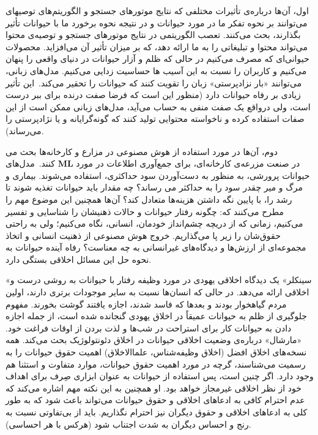 اول، آن‌ها درباره‌ی تأثیرات مختلفی که نتایج موتورهای جستجو و الگوریتم‌های توصیهای می‌توانند بر نحوه تفکر ما در مورد حیوانات و در نتیجه نحوه برخورد ما با حیوانات تأثیر بگذارند، بحث می‌کنند.
تعصب الگوریتمی در نتایج موتورهای جستجو و توصیه‌ی محتوا می‌تواند محتوا و تبلیغاتی را به ما ارائه دهد، که بر میزان تأثیر آن می‌افزاید.
محصولات حیوانی‌ای که مصرف می‌کنیم در حالی که ظلم و آزار حیوانات در دنیای واقعی را پنهان می‌کنیم و کاربران را نسبت به این آسیب ها حساسیت زدایی می‌کنیم.
مدل‌های زبانی، می‌توانند «بار نزادپرستی» زبان را تقویت کنند که حیوانات را تحقیر می‌کند.\     این تأثیر زیادی بر رفاه حیوانات دارد (منظور این است که فرضا صفت درنده برای ببر درست است، ولی درواقع یک صفت منفی به حساب می‌آید، مدل‌های زبانی ممکن است از این صفات استفاده کرده و ناخواسته محتوایی تولید کنند که گونه‌گرایانه و یا نژادپرستی را می‌رساند).

دوم، آن‌ها در مورد استفاده از هوش مصنوعی در مزارع و کارخانه‌ها بحث می کنند.\     مدل‌های \textenglish{\textbf{ML}} در صنعت مزرعه‌ی کارخانه‌ای، برای جمع‌آوری اطلاعات در مورد حیوانات پرورشی، به منظور به دست‌آوردن سود حداکثری، استفاده می‌شوند.
بیماری و مرگ و میر چقدر سود را به حداکثر می رساند؟ چه مقدار باید حیوانات تغذیه شوند تا رشد را، با پایین نگه داشتن هزینه‌ها متعادل کند؟ آن‌ها همچنین این موضوع مهم را مطرح می‌کنند که: چگونه رفتار حیوانات و حالات ذهنیشان را شناسایی و تفسیر می‌کنیم، زمانی که از دریچه چشم‌انداز خودمان، انسانی، نگاه می‌کنیم؛ ولی به راحتی حقوق‌شان را زیر پا می‌گذاریم.
خروج هوش مصنوعی از ذهنیت انسانی و اتخاذ مجموعه‌ای از ارزش‌ها و دیدگاه‌های غیرانسانی به چه معناست؟ رفاه آینده حیوانات به نحوه حل این مسائل اخلاقی بستگی دارد.

«سینکلر» یک دیدگاه اخلاقی یهودی در مورد وظیفه رفتار با حیوانات به روشی درست و اخلاقی ارائه می‌دهد.
در حالی که انسان‌ها نسبت به سایر موجودات برتری دارند، اولین مردم گیاهخوار بودند و بعدها که فاسد شدند، اجازه یافتند گوشت بخورند.
مفهوم جلوگیری از ظلم به حیوانات عمیقاً در اخلاق یهودی گنجانده شده است، از جمله اجازه دادن به حیوانات کار برای استراحت در شب‌ها و لذت بردن از اوقات فراغت خود.
«مارشال» درباره‌ی وضعیت اخلاقی حیوانات در اخلاق دئونتولوژیک بحث می‌کند.
همه نسخه‌های اخلاق افضل (اخلاق وظیفه‌شناس، علماالاخلاق) اهمیت حقوق حیوانات را به رسمیت می‌شناسند، گرچه در مورد اهمیت حقوق حیوانات، موارد متفاوت و استثنا هم وجود دارد.
اگر چنین است، پس استفاده از حیوانات به عنوان ابزاری صِرف برای اهداف خود از نظر اخلاقی غیرمجاز خواهد بود.
او همچنین به این نکته مهم اشاره می‌کند که عدم احترام کافی به ادعاهای اخلاقی و حقوق حیوانات می‌تواند باعث شود که به طور کلی به ادعاهای اخلاقی و حقوق دیگران نیز احترام نگذاریم.
باید از بی‌تفاوتی نسبت به رنج و احساس دیگران به شدت اجتناب شود (هرکس با هر احساسی).

